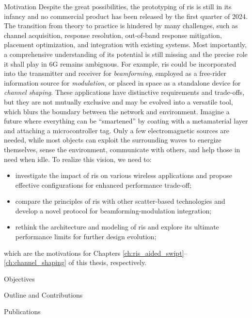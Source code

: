 \begin{section}{Motivation}
	Despite the great possibilities, the prototyping of \gls{ris} is still in its infancy and no commercial product has been released by the first quarter of 2024.
	The transition from theory to practice is hindered by many challenges, such as channel acquisition, response resolution, out-of-band response mitigation, placement optimization, and integration with existing systems.
	Most importantly, a comprehensive understanding of its potential is still missing and the precise role it shall play in 6G remains ambiguous.
	For example, \gls{ris} could be incorporated into the transmitter and receiver for \emph{beamforming}, employed as a free-rider information source for \emph{modulation}, or placed in space as a standalone device for \emph{channel shaping}.
	These applications have distinctive requirements and trade-offs, but they are not mutually exclusive and may be evolved into a versatile tool, which blurs the boundary between the network and environment.
	Imagine a future where everything can be ``smartened'' by coating with a metamaterial layer and attaching a microcontroller tag.
	Only a few electromagnetic sources are needed, while most objects can exploit the surrounding waves to energize themselves, sense the environment, communicate with others, and help those in need when idle.
	To realize this vision, we need to:
	\begin{itemize}
		\item investigate the impact of \gls{ris} on various wireless applications and propose effective configurations for enhanced performance trade-off;
		\item compare the principles of \gls{ris} with other scatter-based technologies and develop a novel protocol for beamforming-modulation integration;
		\item rethink the architecture and modeling of \gls{ris} and explore its ultimate performance limits for further design evolution;
	\end{itemize}
	which are the motivations for Chapters \ref{ch:ris_aided_swipt}--\ref{ch:channel_shaping} of this thesis, respectively.
\end{section}

\begin{section}{Objectives}

\end{section}

\begin{section}{Outline and Contributions}

\end{section}

\begin{section}{Publications}
\end{section}
